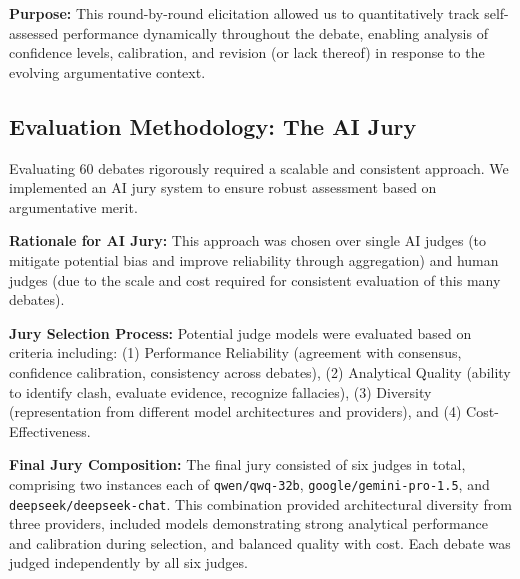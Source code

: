 \documentclass{article}
\begin{document}
\textbf{Purpose:} This round-by-round elicitation allowed us to quantitatively track self-assessed performance dynamically throughout the debate, enabling analysis of confidence levels, calibration, and revision (or lack thereof) in response to the evolving argumentative context.

\subsection{Evaluation Methodology: The AI Jury}
\label{subsec:ai_jury}

Evaluating 60 debates rigorously required a scalable and consistent approach. We implemented an AI jury system to ensure robust assessment based on argumentative merit.

\textbf{Rationale for AI Jury:} This approach was chosen over single AI judges (to mitigate potential bias and improve reliability through aggregation) and human judges (due to the scale and cost required for consistent evaluation of this many debates).

\textbf{Jury Selection Process:} Potential judge models were evaluated based on criteria including: (1) Performance Reliability (agreement with consensus, confidence calibration, consistency across debates), (2) Analytical Quality (ability to identify clash, evaluate evidence, recognize fallacies), (3) Diversity (representation from different model architectures and providers), and (4) Cost-Effectiveness.

\textbf{Final Jury Composition:} The final jury consisted of six judges in total, comprising two instances each of \texttt{qwen/qwq-32b}, \texttt{google/gemini-pro-1.5}, and \texttt{deepseek/deepseek-chat}. This combination provided architectural diversity from three providers, included models demonstrating strong analytical performance and calibration during selection, and balanced quality with cost. Each debate was judged independently by all six judges.
\end{document}
